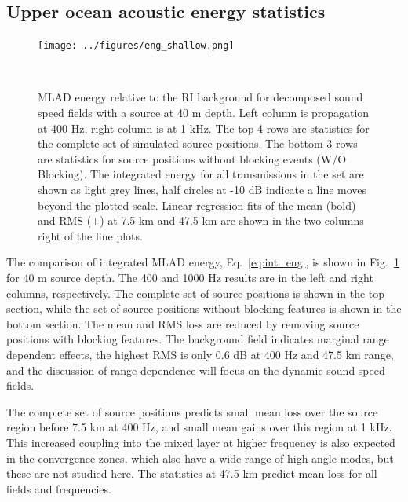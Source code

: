 \documentclass[preprint,NumberedRefs]{JASA}
\begin{document}
\subsection{Upper ocean acoustic energy statistics}\label{ssec:energy}
\begin{figure}
\texttt{[image: ../figures/eng\_shallow.png]}
    \caption{MLAD energy relative to the RI background for decomposed sound speed fields with a source at 40 m depth. Left column is propagation at 400 Hz, right column is at 1 kHz. The top 4 rows are statistics for the complete set of simulated source positions. The bottom 3 rows are statistics for source positions without blocking events (W/O Blocking). The integrated energy for all transmissions in the set are shown as light grey lines, half circles at -10 dB indicate a line moves beyond the plotted scale. Linear regression fits of the mean (bold) and RMS ($\pm$) at 7.5 km and 47.5 km are shown in the two columns right of the line plots.}
    \label{fig:shal_eng}
\end{figure}

The comparison of integrated MLAD energy, Eq.~\eqref{eq:int_eng}, is shown in Fig.~\ref{fig:shal_eng} for 40 m source depth. The 400 and 1000 Hz results are in the left and right columns, respectively. The complete set of source positions is shown in the top section, while the set of source positions without blocking features is shown in the bottom section. The mean and RMS loss are reduced by removing source positions with blocking features. The background field indicates marginal range dependent effects, the highest RMS is only 0.6 dB at 400 Hz and 47.5 km range, and the discussion of range dependence will focus on the dynamic sound speed fields.

The complete set of source positions predicts small mean loss over the source region before 7.5 km at 400 Hz, and small mean gains over this region at 1 kHz. This increased coupling into the mixed layer at higher frequency is also expected in the convergence zones, which also have a wide range of high angle modes, but these are not studied here. The statistics at 47.5 km predict mean loss for all fields and frequencies.
\end{document}

